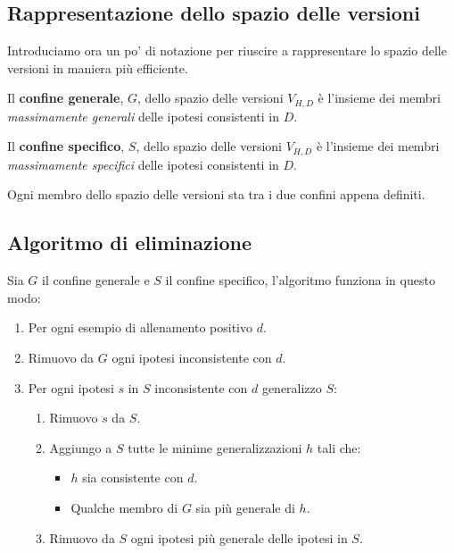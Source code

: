 \subsection{Rappresentazione dello spazio delle versioni}
Introduciamo ora un po' di notazione per riuscire a rappresentare lo spazio delle versioni in maniera pi\`u efficiente.

\begin{definition}
	Il \textbf{confine generale}, $G$, dello spazio delle versioni $V_{H, D}$ \`e l'insieme dei membri
	\emph{massimamente generali} delle ipotesi consistenti in $D$.
\end{definition}

\begin{definition}
	Il \textbf{confine specifico}, $S$, dello spazio delle versioni $V_{H, D}$ \`e l'insieme dei membri
	\emph{massimamente specifici} delle ipotesi consistenti in $D$.
\end{definition}

\begin{theorem}
	Ogni membro dello spazio delle versioni sta tra i due confini appena definiti.
\end{theorem}

\subsection{Algoritmo di eliminazione}
Sia $G$ il confine generale e $S$ il confine specifico, l'algoritmo funziona in questo modo:
\begin{enumerate}
	\item Per ogni esempio di allenamento positivo $d$.
	\item Rimuovo da $G$ ogni ipotesi inconsistente con $d$.
	\item Per ogni ipotesi $s$ in $S$ inconsistente con $d$ generalizzo $S$:
	      \begin{enumerate}
		      \item Rimuovo $s$ da $S$.
		      \item Aggiungo a $S$ tutte le minime generalizzazioni $h$ tali che:
		            \begin{itemize}
			            \item $h$ sia consistente con $d$.
			            \item Qualche membro di $G$ sia pi\`u generale di $h$.
		            \end{itemize}
		      \item Rimuovo da $S$ ogni ipotesi pi\`u generale delle ipotesi in $S$.
	      \end{enumerate}
\end{enumerate}


